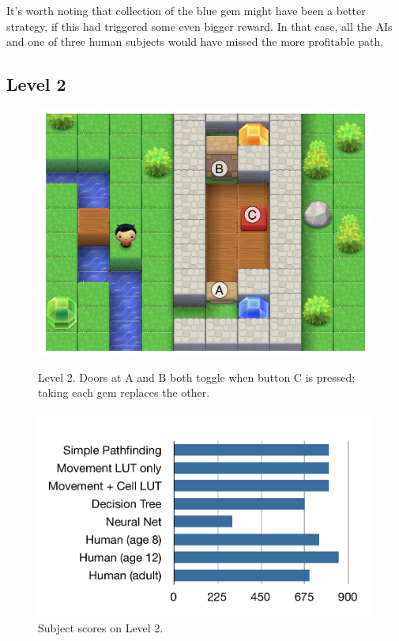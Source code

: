 \documentclass{article}
\begin{document}
It's worth noting that collection of the blue gem might have been a better strategy, if this had triggered some even bigger reward.  In that case, all the AIs and one of three human subjects would have missed the more profitable path.

\subsection{Level 2}

\begin{figure}[ht]
\begin{minipage}[t]{0.45\linewidth}
\centering
\includegraphics[width=\textwidth]{figLevel2.pdf}
\caption{Level 2.  Doors at A and B both toggle when button C is pressed; taking each gem replaces the other.}
\label{figLevel2}
\end{minipage}
\hspace{0.5cm}
\begin{minipage}[b]{0.45\linewidth}
\centering
\includegraphics[width=\textwidth]{figScores2.pdf}
\caption{Subject scores on Level 2.}
\label{figScores2}
\end{minipage}
\end{figure}
\end{document}
